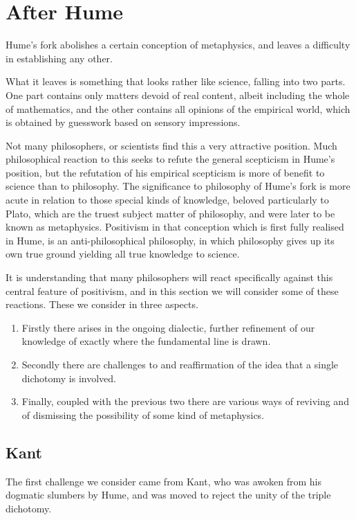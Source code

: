 \def\rbjidafter{$$Id: after.tex,v 1.4 2009/10/12 11:22:44 rbj Exp $$}

\section{After Hume}\label{After}

Hume's fork abolishes a certain conception of metaphysics, and leaves a difficulty in establishing any other.

What it leaves is something that looks rather like science, falling into two parts.
One part contains only matters devoid of real content, albeit including the whole of mathematics, and the other contains all opinions of the empirical world, which is obtained by guesswork based on sensory impressions.

Not many philosophers, or scientists find this a very attractive position.
Much philosophical reaction to this seeks to refute the general scepticism in Hume's position, but the refutation of his empirical scepticism is more of benefit to science than to philosophy.
The significance to philosophy of Hume's fork is more acute in relation to those special kinds of knowledge, beloved particularly to Plato, which are the truest subject matter of philosophy, and were later to be known as metaphysics.
Positivism in that conception which is first fully realised in Hume, is an anti-philosophical philosophy, in which philosophy gives up its own true ground yielding all true knowledge to science.

It is understanding that many philosophers will react specifically against this central feature of positivism,
and in this section we will consider some of these reactions.
These we consider in three aspects.
\begin{enumerate}
\item
Firstly there arises in the ongoing dialectic, further refinement of our knowledge of exactly where the fundamental line is drawn.
\item
Secondly there are challenges to and reaffirmation of the idea that a single dichotomy is involved.
\item
Finally, coupled with the previous two there are various ways of reviving and of dismissing the possibility of some kind of metaphysics.
\end{enumerate}

\subsection{Kant}

The first challenge we consider came from Kant, who was awoken from his dogmatic slumbers by Hume, and was moved to reject the unity of the triple dichotomy.
